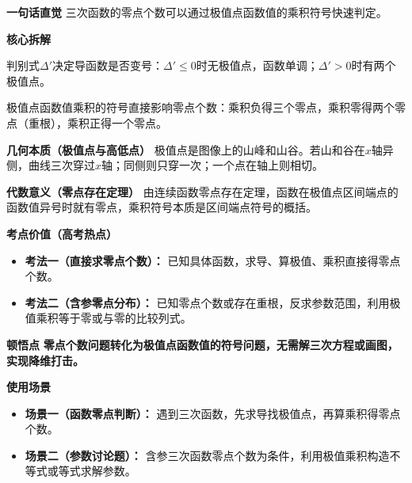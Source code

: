 \begin{explanationbox}
	\textbf{\textcolor{CExplanation}{一句话直觉}}
	三次函数的零点个数可以通过极值点函数值的乘积符号快速判定。

	\medskip
	\textbf{\textcolor{CExplanation}{核心拆解}}
	\begin{description}[style=nextline, leftmargin=2.8em, labelsep=0.5em, itemsep=0.45em]
		\item[\textbf{要点一（极值点有无）：}]
			判别式\(\Delta'\)决定导函数是否变号：\(\Delta'\leq0\)时无极值点，函数单调；\(\Delta'>0\)时有两个极值点。
		\item[\textbf{要点二（乘积符号判零点）：}]
			极值点函数值乘积的符号直接影响零点个数：乘积负得三个零点，乘积零得两个零点（重根），乘积正得一个零点。
	\end{description}

	\medskip
	\textbf{\textcolor{CExplanation}{几何本质（极值点与高低点）}}
	极值点是图像上的山峰和山谷。若山和谷在\(x\)轴异侧，曲线三次穿过\(x\)轴；同侧则只穿一次；一个点在轴上则相切。

	\medskip
	\textbf{\textcolor{CExplanation}{代数意义（零点存在定理）}}
	由连续函数零点存在定理，函数在极值点区间端点的函数值异号时就有零点，乘积符号本质是区间端点符号的概括。

	\medskip
	\textbf{\textcolor{CExplanation}{考点价值（高考热点）}}
	\begin{itemize}[leftmargin=*, itemsep=0.5em, topsep=0.4em]
		\item \textbf{考法一（直接求零点个数）：} 已知具体函数，求导、算极值、乘积直接得零点个数。
		\item \textbf{考法二（含参零点分布）：} 已知零点个数或存在重根，反求参数范围，利用极值乘积等于零或与零的比较列式。
	\end{itemize}

	\medskip
	\textbf{\textcolor{CExplanation}{顿悟点}}
	\textbf{零点个数问题转化为极值点函数值的符号问题，无需解三次方程或画图，实现降维打击。}

	\medskip
	\textbf{\textcolor{CExplanation}{使用场景}}
	\begin{itemize}[leftmargin=*, itemsep=0.5em, topsep=0.4em]
		\item \textbf{场景一（函数零点判断）：} 遇到三次函数，先求导找极值点，再算乘积得零点个数。
		\item \textbf{场景二（参数讨论题）：} 含参三次函数零点个数为条件，利用极值乘积构造不等式或等式求解参数。
	\end{itemize}

\end{explanationbox}
